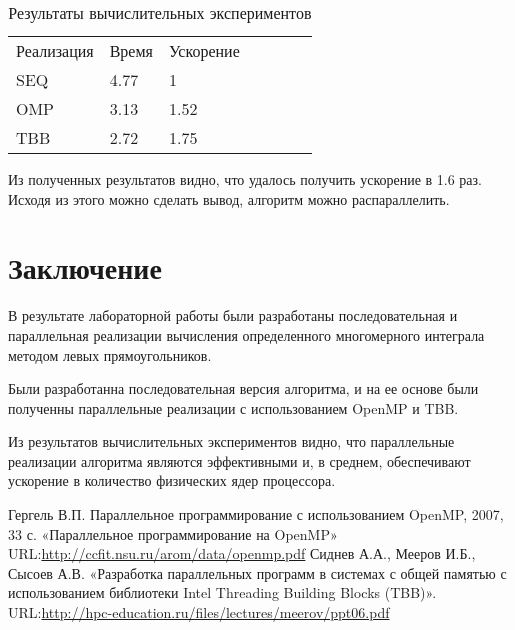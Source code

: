 \documentclass{report}
\begin{document}
 \begin{table}[!h]
 \begin{center}
 \begin{tabular}{lllllll}
 Реализация & Время & Ускорение   \\
 SEQ        & 4.77 & 1           \\
 OMP        & 3.13 & 1.52       \\
 TBB        & 2.72 & 1.75       \\

 \end{tabular}
 \end{center}
 \caption{Результаты вычислительных экспериментов}
 \centering
 \end{table}

 \par Из полученных результатов видно, что удалось получить ускорение в 1.6 раз. Исходя из этого можно сделать вывод, алгоритм можно распараллелить.
 \newpage

 \section*{Заключение}
 В результате лабораторной работы были разработаны последовательная и параллельная реализации вычисления определенного многомерного интеграла методом левых прямоугольников.
 \par Были разработанна последовательная версия алгоритма, и на ее основе были полученны параллельные реализации с использованием OpenMP и TBB. 
 \par Из результатов вычислительных экспериментов видно, что параллельные реализации алгоритма являются эффективными и, в среднем, обеспечивают ускорение в количество физических ядер процессора.
 \newpage

 \begin{thebibliography}{1}
  Гергель В.П. Параллельное программирование с использованием
 OpenMP, 2007, 33 с.
 \bibitem{} «Параллельное программирование на OpenMP»
 \\URL:\url {http://ccfit.nsu.ru/arom/data/openmp.pdf}
  Сиднев А.А., Мееров И.Б., Сысоев А.В. «Разработка параллельных программ в системах с общей памятью с использованием библиотеки Intel Threading Building Blocks (TBB)».
 \\URL:\url {http://hpc-education.ru/files/lectures/meerov/ppt06.pdf}
 \end{thebibliography}
 \newpage
\end{document}
